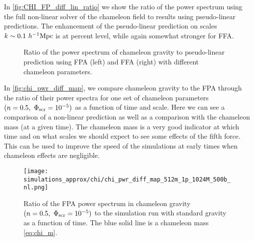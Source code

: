 In \autoref{fig:CHI_FP_diff_lin_ratio} we show the ratio of the power spectrum using the full non-linear solver of the chameleon field to results using pseudo-linear predictions. The enhancement of the pseudo-linear prediction on scales $k\sim0.1~h^{-1}\text{Mpc}$ is at percent level, while again somewhat stronger for FFA.

\begin{figure*}[!tb]
  \centering
	\begin{subfigure}{1.2\textwidth}
		\chileft
	\end{subfigure}
	\begin{subfigure}{0.5\textwidth}
	\end{subfigure}%
	\begin{subfigure}{0.5\textwidth}
	\end{subfigure}
  \caption{Ratio of the power spectrum of chameleon gravity to pseudo-linear prediction using FPA (left) and FFA (right) with different chameleon parameters.}
  \label{fig:CHI_FP_diff_lin_ratio}
\end{figure*}

In \autoref{fig:chi_pwr_diff_map}, we compare chameleon gravity to the FPA through the ratio of their power spectra for one set of chameleon parameters $(n=0.5,\ \Phi_{\text{\scriptsize scr}}=10^{-5})$ as a function of time and scale. Here we can see a comparison of a non-linear prediction as well as a comparison with the chameleon mass (at a given time). The chameleon mass is a very good indicator at which time and on what scales we should expect to see some effects of the fifth force. This can be used to improve the speed of the simulations at early times when chameleon effects are negligible.
\begin{figure}[!tb]
	\centering
	\chileft
	\texttt{[image: simulations\_approx/chi/chi\_pwr\_diff\_map\_512m\_1p\_1024M\_500b\_nl.png]}
	\caption{Ratio of the FPA power spectrum in chameleon gravity $(n=0.5,\ \Phi_{\text{\scriptsize scr}}=10^{-5})$ to the simulation run with standard gravity as a function of time. The blue solid line is a chameleon mass \eqref{eq:chi_m}.}
	\label{fig:chi_pwr_diff_map}
\end{figure}


